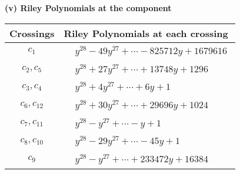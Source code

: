 \documentclass[1p]{elsarticle_modified}
\theoremstyle{definition}
\begin{document}
\flushleft \textbf{(v) Riley Polynomials at the component}\newline \\
\begin{tabular}{m{50pt}|m{274pt}}
Crossings & \hspace{64pt}Riley Polynomials at each crossing \\
\hline $$\begin{aligned}c_{1}\end{aligned}$$&$\begin{aligned}
&y^{28}-49 y^{27}+\cdots-825712 y+1679616
\end{aligned}$\\
\hline $$\begin{aligned}c_{2},c_{5}\end{aligned}$$&$\begin{aligned}
&y^{28}+27 y^{27}+\cdots+13748 y+1296
\end{aligned}$\\
\hline $$\begin{aligned}c_{3},c_{4}\end{aligned}$$&$\begin{aligned}
&y^{28}+4 y^{27}+\cdots+6 y+1
\end{aligned}$\\
\hline $$\begin{aligned}c_{6},c_{12}\end{aligned}$$&$\begin{aligned}
&y^{28}+30 y^{27}+\cdots+29696 y+1024
\end{aligned}$\\
\hline $$\begin{aligned}c_{7},c_{11}\end{aligned}$$&$\begin{aligned}
&y^{28}- y^{27}+\cdots- y+1
\end{aligned}$\\
\hline $$\begin{aligned}c_{8},c_{10}\end{aligned}$$&$\begin{aligned}
&y^{28}-29 y^{27}+\cdots-45 y+1
\end{aligned}$\\
\hline $$\begin{aligned}c_{9}\end{aligned}$$&$\begin{aligned}
&y^{28}- y^{27}+\cdots+233472 y+16384
\end{aligned}$\\
\hline
\end{tabular}\\~\\
\end{document}
